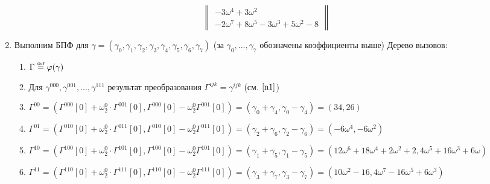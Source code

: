 \documentclass[a4paper]{article}
\def\eqdef{\overset{\mbox{\tiny def}}{=}}
\begin{document}
\begin{enumerate}
$$\begin{Vmatrix}
-3\omega^4+3\omega^2\\
-2\omega^7+8\omega^5-3\omega^3+5\omega^2-8
\end{Vmatrix}
$$\newpage
\item Выполним БПФ для $\gamma=(\gamma_0,\gamma_1,\gamma_2,\gamma_3,\gamma_4,\gamma_5,\gamma_6,\gamma_7)$ (за $\gamma_0,...,\gamma_7$ обозначены коэффициенты выше) Дерево вызовов:\newline
{}
\begin{enumerate}
\item $\Gamma\eqdef\varphi(\gamma)$
\item Для $\gamma^{000}, \gamma^{001}, ..., \gamma^{111}$ результат преобразования $\Gamma^{ijk}=\gamma^{ijk}$ (см. $\ref{n1}$)
\item $\Gamma^{00}=(\Gamma^{000}[0]+\omega_2^0\cdot \Gamma^{001}[0],\Gamma^{000}[0]-\omega_2^0\Gamma^{001}[0])=(\gamma_0+\gamma_4,\gamma_0-\gamma_4)=(34,26)$
\item $\Gamma^{01}=(\Gamma^{010}[0]+\omega_2^0\cdot \Gamma^{011}[0],\Gamma^{010}[0]-\omega_2^0\Gamma^{011}[0])=(\gamma_2+\gamma_6,\gamma_2-\gamma_6)=(-6\omega^4,-6\omega^2)$
\item $\Gamma^{10}=(\Gamma^{100}[0]+\omega_2^0\cdot \Gamma^{101}[0],\Gamma^{100}[0]-\omega_2^0\Gamma^{101}[0])=(\gamma_1+\gamma_5,\gamma_1-\gamma_5)=(12\omega^6+18\omega^4+2\omega^2+2,4\omega^5+16\omega^3+6\omega)$
\item $\Gamma^{11}=(\Gamma^{110}[0]+\omega_2^0\cdot \Gamma^{111}[0],\Gamma^{110}[0]-\omega_2^0\Gamma^{111}[0])=(\gamma_3+\gamma_7,\gamma_3-\gamma_7)=(10\omega^2-16,4\omega^7-16\omega^5+6\omega^3)$


\end{enumerate}
\end{enumerate}
\end{document}
